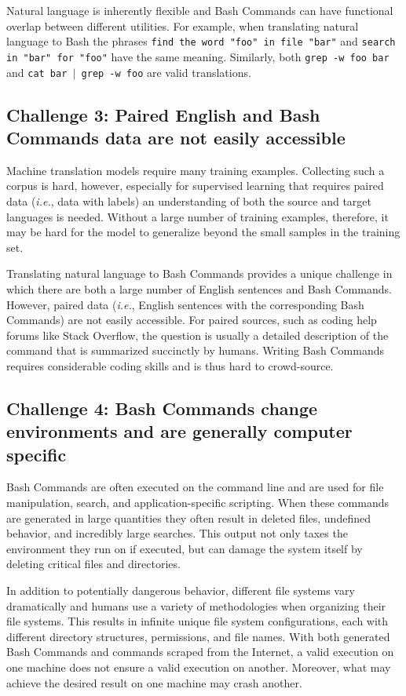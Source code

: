 \documentclass{river-journal}
\begin{document}
Natural language is inherently flexible and Bash Commands can have functional overlap between different utilities. For example, when translating natural language to Bash the phrases \texttt{find the word "foo" in file "bar"} and \texttt{search in "bar" for "foo"} have the same meaning. Similarly, both \texttt{grep -w foo bar} and \texttt{cat bar $\vert$ grep -w foo} are valid translations.

\subsection{\bf Challenge 3: Paired English and Bash Commands data are not easily accessible}
\label{lowresource.section}

Machine translation models require many training examples. Collecting such a corpus is hard, however, especially for supervised learning that requires paired data (\textit{i.e.}, data with labels) an understanding of both the source and target languages is needed. Without a large number of training examples, therefore, it may be hard for the model to generalize beyond the small samples in the training set. 

Translating natural language to Bash Commands provides a unique challenge in which there are both a large number of English sentences and Bash Commands. However, paired data (\textit{i.e.}, English sentences with the corresponding Bash Commands) are not easily accessible. For paired sources, such as coding help forums like Stack Overflow, the question is usually a detailed description of the command that is summarized succinctly by humans. Writing Bash Commands requires considerable coding skills and is thus hard to crowd-source.

\subsection{\bf Challenge 4: Bash Commands change environments and are generally computer specific}
\label{lowresource2.section}

Bash Commands are often executed on the command line and are used for file manipulation, search, and application-specific scripting. When these commands are generated in large quantities they often result in deleted files, undefined behavior, and incredibly large searches. This output not only taxes the environment they run on if executed, but can damage the system itself by deleting critical files and directories.

In addition to potentially dangerous behavior, different file systems vary dramatically and humans use a variety of methodologies when organizing their file systems. This results in infinite unique file system configurations, each with different directory structures, permissions, and file names. With both generated Bash Commands and commands scraped from the Internet, a valid execution on one machine does not ensure a valid execution on another. Moreover, what may achieve the desired result on one machine may crash another.
\end{document}

